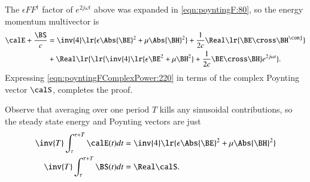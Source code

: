 The \( \epsilon F F^\dagger \) factor of \( e^{2 j \omega t} \) above was expanded in \cref{eqn:poyntingF:80}, so the energy momentum multivector is
\begin{dmath}\label{eqn:poyntingFComplexPower:220}
\begin{aligned}
\calE + \frac{\BS}{c}
&=
\inv{4} \lr{
\epsilon \Abs{\BE}^2 + \mu \Abs{\BH}^2 }
+
\frac{1}{2 c} \Real \lr{
\BE \cross \BH^\conj
} \\
&+
\Real
\lr{
   \lr{
     \inv{4} \lr{ \epsilon \BE^2 + \mu \BH^2 }
   + \frac{1}{2 c} \BE \cross \BH
   }
   e^{2 j \omega t }
}.
\end{aligned}
\end{dmath}
Expressing \cref{eqn:poyntingFComplexPower:220} in terms
of the complex Poynting vector \( \calS \), completes the proof.

Observe that
averaging over one period \( T \) kills any sinusoidal contributions, so the steady state energy and Poynting vectors are just
\begin{dmath}\label{eqn:poyntingFComplexPower:280}
\begin{aligned}
\inv{T} \int_\tau^{\tau+T} \calE(t) dt &=
\inv{4} \lr{
\epsilon \Abs{\BE}^2 + \mu \Abs{\BH}^2 } \\
\inv{T} \int_\tau^{\tau+T} \BS(t) dt &= \Real \calS.
\end{aligned}
\end{dmath}

